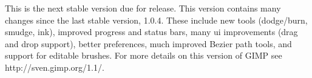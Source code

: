 This is the next stable version due for release.  This version contains many
changes since the last stable version, 1.0.4. These include new tools
(dodge/burn, smudge, ink), improved progress and status bars, many ui
improvements (drag and drop support), better preferences, much improved Bezier
path tools, and support for editable brushes. For more details on this version
of GIMP see http://sven.gimp.org/1.1/.
